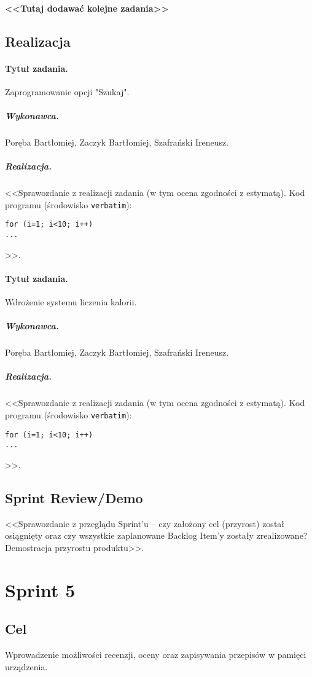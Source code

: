 \documentclass[a4paper]{article}
\begin{document}
\paragraph{<<Tutaj dodawać kolejne zadania>>}

\subsection{Realizacja}

\paragraph{Tytuł zadania.} Zaprogramowanie opcji "Szukaj".
\subparagraph{Wykonawca.} Poręba Bartłomiej, Zaczyk Bartłomiej, Szafrański Ireneusz.
\subparagraph{Realizacja.} <<Sprawozdanie z realizacji zadania (w tym ocena zgodności z estymatą). Kod programu (środowisko \texttt{verbatim}): \begin{verbatim}
for (i=1; i<10; i++)
...
\end{verbatim}>>.

\paragraph{Tytuł zadania.} Wdrożenie systemu liczenia kalorii.
\subparagraph{Wykonawca.} Poręba Bartłomiej, Zaczyk Bartłomiej, Szafrański Ireneusz.
\subparagraph{Realizacja.} <<Sprawozdanie z realizacji zadania (w tym ocena zgodności z estymatą). Kod programu (środowisko \texttt{verbatim}): \begin{verbatim}
for (i=1; i<10; i++)
...
\end{verbatim}>>.



\subsection{Sprint Review/Demo}
<<Sprawozdanie z przeglądu Sprint'u -- czy założony cel (przyrost) został osiągnięty oraz czy wszystkie zaplanowane Backlog Item'y zostały zrealizowane? Demostracja przyrostu produktu>>.


\section{Sprint 5}

\subsection{Cel} Wprowadzenie możliwości recenzji, oceny oraz zapisywania przepisów w pamięci urządzenia.
\end{document}
